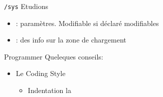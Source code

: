 \begin{frame}[fragile=singleslide]{\texttt{/sys}}
  Etudions 
  \begin{itemize}
  \item                       {}:
    paramètres. Modifiable si déclaré modifiables
  \item {}:  des info sur  la zone
    de chargement
  \end{itemize}
\end{frame}

\begin{frame}[fragile=singleslide]{Programmer}
  Queleques conseils:
  \begin{itemize} 
    \item Le Coding Style
      \begin{itemize} 
        \item Indentation  la 
\end{itemize} 
  \end{itemize} 
\end{frame} 





